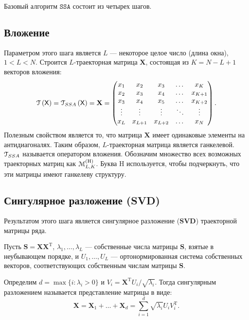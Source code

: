 \documentclass[12pt, specialist, subf
]{disser}
\theoremstyle{definition}
\newcommand{\SSA}{\texttt{SSA}}
\newcommand{\TS}{\mathsf{X}}
\newcommand{\MH}{\EuScript{M}_{L,K}^{(\mathrm{H})}}
\begin{document}
Базовый алгоритм $\SSA$ состоит из четырех шагов.

\subsection*{Вложение}
Параметром этого шага является $L$ --- некоторое целое число (длина окна), $1 < L < N$. Строится $L$-траекторная матрица $\mathbf{X}$, состоящая из $K = N - L + 1$ векторов вложения:
\begin{equation}
	\label{eq:X}
	\EuScript{T} \left(\TS \right) = \EuScript{T}_{SSA} \left(\TS \right)=
	\mathbf{X} =
	\begin{pmatrix}
		x_1    & x_2     & x_3     & \dots  & x_{K}   \\
		x_2    & x_3     & x_4     & \dots  & x_{K+1} \\
		x_3    & x_4     & x_5     & \dots  & x_{K+2} \\
		\vdots & \vdots  & \vdots  & \ddots & \vdots  \\
		x_{L}  & x_{L+1} & x_{L+2} & \dots  & x_{N}
	\end{pmatrix}.
\end{equation}
Полезным свойством является то, что матрица $\mathbf{X}$ имеет одинаковые элементы на антидиагоналях. Таким образом, $L$-траекторная матрица является ганкелевой. $\EuScript{T}_{SSA}$ называется оператором вложения. Обозначим множество всех возможных траекторных матриц как \( \MH \). Буква \( \mathrm{H} \) используется, чтобы подчеркнуть, что эти матрицы имеют ганкелеву структуру.

\subsection*{Сингулярное разложение (SVD)}
Результатом этого шага является сингулярное разложение ($\mathbf{SVD}$) траекторной матрицы ряда.

Пусть $\mathbf{S} = \mathbf{X}\mathbf{X}^{\mathrm{T}}$,
$\lambda_1, \dots, \lambda_L$ --- собственные числа матрицы $\mathbf{S}$, взятые в неубывающем порядке, и
$U_1, \dots, U_L$ --- ортонормированная система собственных векторов, соответствующих собственным числам матрицы $\mathbf S$.

Определим $d = \max{ \{i: \lambda_i > 0 \}}$ и
$V_i = \mathbf{X}^{\mathrm{T}} U_i / \sqrt{\lambda_i}$.
Тогда сингулярным разложением называется представление матрицы в виде:
\begin{equation}
	\mathbf{X} = \mathbf{X}_1 + \dots + \mathbf{X}_d =
	\sum_{i = 1}^{d} \sqrt{\lambda_i} U_i V_{i}^{\mathrm{T}}\label{eq:1}.
\end{equation}
\end{document}
